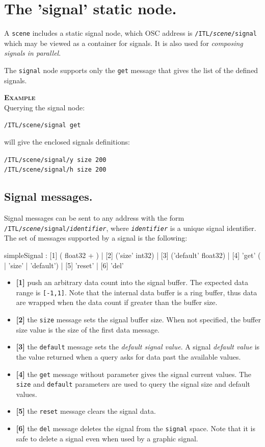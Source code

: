 \documentclass[a4paper,twoside]{report}
\newcommand{\sublevel}[1]	{\section{#1}}
\newcommand{\subsublevel}[1]	{\subsection{#1}}
\newcommand{\OSC}[1]		{\texttt{#1}}
\newcommand{\values}[1]	{\texttt{#1}}
\newcommand{\example}		{\textbf{\hspace{-1.5cm}\textbf{\textsc{Example }}}}
\newcommand{\sample}	[1]			{\vspace{-2mm}\begin{center}\colorbox{mygrey}{
								\begin{minipage}[t]{0.9\columnwidth} 
								{\small \texttt{#1}}
								\end{minipage}}\end{center}}
\newcommand{\sampleindent}	{ \hspace{0.5cm} }
\begin{document}
\sublevel{The 'signal' static node.}
A \OSC{scene} includes a static signal node, which OSC address is \OSC{/ITL/\textit{scene}/signal} which may be viewed as a container for signals. It is also used for \textit{composing signals in parallel}.

The \OSC{signal} node supports only the \OSC{get} message that gives the list of the defined signals.

\example \\
Querying the signal node:
\sample{/ITL/scene/signal get}
\sampleindent will give the enclosed signals definitions:
\sample{/ITL/scene/signal/y size 200 \\
/ITL/scene/signal/h size 200
}


\subsublevel{Signal messages.}
\label{ssignal}
Signal messages can be sent to any address with the form \OSC{/ITL/\textit{scene}/signal/\textit{identifier}}, where \OSC{\textit{identifier}} is a unique signal identifier.
The set of messages supported by a signal is the following:
\begin{rail}
simpleSignal : [1] ( float32 + )
		| [2] ('size' int32) 
		| [3] ('default' float32)
		| [4] 'get' ( | 'size' | 'default')
		| [5] 'reset'
		| [6] 'del'
\end{rail}

\begin{itemize}
\item \textbf{[1]} push an arbitrary data count into the signal buffer. The expected data range is \values{[-1,1]}. Note that the internal data buffer is a ring buffer, thus data are wrapped when the data count if greater than the buffer size. 
\item \textbf{[2]} the \OSC{size} message sets the signal buffer size. When not specified, the buffer size value is the size of the first data message. 
\item \textbf{[3]} the \OSC{default} message sets the \emph{default signal value}. A signal \emph{default value} is the value returned when a query asks for data past the available values.
\item \textbf{[4]} the \OSC{get} message without parameter gives the signal current values. The \OSC{size} and  \OSC{default} parameters are used to query the signal size and default values.
\item \textbf{[5]} the \OSC{reset} message clears the signal data. 
\item \textbf{[6]} the \OSC{del} message deletes the signal from the \OSC{signal} space. Note that it is safe to delete a signal even when used by a graphic signal. 
\end{itemize}
\end{document}
